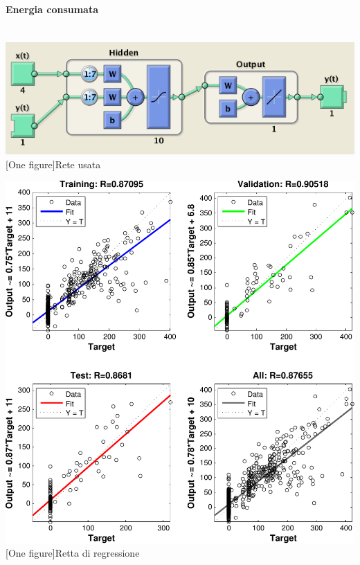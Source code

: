 \paragraph{Energia consumata}
\hspace{10px} \\
\vspace{20px}
\includegraphics[scale=0.5]{images/timeseries/energia/net.png}
[One figure]{Rete usata}
\vspace{20px}

\includegraphics[scale=0.5]{images/timeseries/energia/regressions.pdf}
[One figure]{Retta di regressione}
\vspace{20px}

